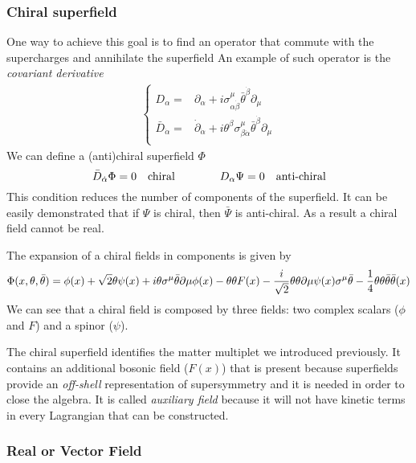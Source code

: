 \begin{appendices}
\subsubsection{Chiral superfield}
One way to achieve this goal is to find an operator that commute with the supercharges and annihilate the superfield
An example of such operator is the \emph{covariant derivative} 
\begin{align}
	\begin{cases}
		D_{\alpha} =&  \partial_{\alpha} + i \sigma^{\mu}_{\alpha \dot{\beta}} \bar{\theta}^{\dot{\beta}} \partial_{\mu} \\
		\bar{D}_{\dot{\alpha}}  =&   \dot{\partial}_{\dot{\alpha}} + i  \theta^{\beta} \sigma^{\mu}_{\beta \dot{\alpha} } \bar{\theta}^{\dot{\beta}} \partial_{\mu} \\
	\end{cases}
\end{align}
We can define a (anti)chiral superfield $\Phi$ 
\begin{equation}
\bar{D}_{\dot{\alpha}}\Phi = 0 \quad \hbox{chiral} \qquad  \qquad D_{\alpha}  \Psi = 0 \quad \hbox{anti-chiral}
\end{equation}
This condition reduces the number of components of the superfield.
It can be easily demonstrated that if $\Psi$ is chiral, then $\bar{\Psi}$ is anti-chiral.
As a result a chiral field cannot be real. 

The expansion of a chiral fields in components is given by
\begin{equation}
\Phi ( x, \theta, \bar{\theta} ) = 
 \phi(x) + \sqrt{2}\theta \psi(x) + i \theta \sigma^{\mu} \bar{\theta} \partial{\mu} \phi(x) - \theta \theta F(x) - \frac{i}{\sqrt{2}} \theta \theta \partial{\mu} \psi(x) \sigma^{\mu} \bar{\theta} - \frac{1}{4} \theta \theta \bar{\theta} \bar{\theta} \box \phi(x)
 \end{equation}
We can see that a chiral field is composed by three fields: two complex scalars ($\phi$ and $F$) and a spinor ($\psi$). 

The chiral superfield identifies the matter multiplet we introduced previously. 
It contains an additional bosonic field ($F(x)$) that is present because superfields provide an \emph{off-shell} representation of supersymmetry and it is needed in order to close the algebra.
It is called \emph{auxiliary field} because it will not have kinetic terms in every Lagrangian that can be constructed. 

\subsubsection{Real or Vector Field}


\end{appendices}
